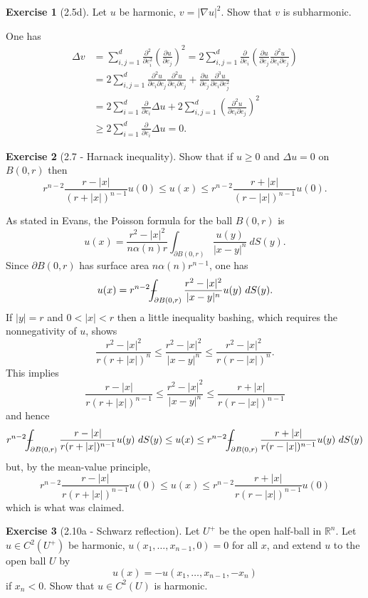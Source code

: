 \documentclass[10pt]{article}
\newcommand{\RR}{\mathbb{R}}
\def\Xint#1{\mathchoice
{\XXint\displaystyle\textstyle{#1}}%
{\XXint\textstyle\scriptstyle{#1}}%
{\XXint\scriptstyle\scriptscriptstyle{#1}}%
{\XXint\scriptscriptstyle\scriptscriptstyle{#1}}%
\!\int}
\def\XXint#1#2#3{{\setbox0=\hbox{$#1{#2#3}{\int}$ }
\vcenter{\hbox{$#2#3$ }}\kern-.6\wd0}}
\def\dashint{\Xint-}
\theoremstyle{definition}
\newtheorem{exer}{Exercise}
\begin{document}
\begin{exer}[2.5d]
Let $u$ be harmonic, $v = |\nabla u|^2$. Show that $v$ is subharmonic.
\end{exer}

One has
\begin{align*}\Delta v &= \sum_{i,j=1}^d \frac{\partial^2}{\partial e_i^2} \left(\frac{\partial u}{\partial e_j} \right)^2 = 2\sum_{i,j=1}^d \frac{\partial}{\partial e_i}\left(\frac{\partial u}{\partial e_j} \frac{\partial^2 u}{\partial e_i \partial e_j}\right)\\
&= 2\sum_{i,j=1}^d \frac{\partial^2 u}{\partial e_i \partial e_j} \frac{\partial^2 u}{\partial e_i \partial e_j} + \frac{\partial u}{\partial e_j} \frac{\partial^3 u}{\partial e_i \partial e_j^2}\\
&= 2\sum_{i=1}^d \frac{\partial}{\partial e_i} \Delta u + 2\sum_{i,j=1}^d \left(\frac{\partial^2 u}{\partial e_i \partial e_j}\right)^2\\
&\geq 2\sum_{i=1}^d \frac{\partial}{\partial e_i} \Delta u = 0.
\end{align*}

\begin{exer}[2.7 - Harnack inequality]
Show that if $u \geq 0$ and $\Delta u = 0$ on $B(0, r)$ then
$$r^{n-2} \frac{r - |x|}{(r + |x|)^{n-1}} u(0) \leq u(x) \leq r^{n-2} \frac{r + |x|}{(r - |x|)^{n-1}} u(0).$$
\end{exer}

As stated in Evans, the Poisson formula for the ball $B(0, r)$ is
$$u(x) = \frac{r^2 - |x|^2}{n\alpha(n)r} \int_{\partial B(0, r)} \frac{u(y)}{|x - y|^n} ~dS(y).$$
Since $\partial B(0, r)$ has surface area $n\alpha(n)r^{n-1}$, one has
$$u(x) = r^{n-2} \dashint_{\partial B(0, r)} \frac{r^2 - |x|^2}{|x - y|^n} u(y)~dS(y).$$
If $|y| = r$ and $0 < |x| < r$ then a little inequality bashing, which requires the nonnegativity of $u$, shows
$$\frac{r^2 - |x|^2}{r(r+|x|)^n} \leq \frac{r^2 - |x|^2}{|x - y|^n} \leq \frac{r^2 - |x|^2}{r(r-|x|)^n}.$$
This implies
$$\frac{r-|x|}{r(r+|x|)^{n-1}} \leq \frac{r^2 - |x|^2}{|x - y|^n} \leq \frac{r+|x|}{r(r-|x|)^{n-1}}$$
and hence
$$r^{n-2} \dashint_{\partial B(0, r)} \frac{r-|x|}{r(r+|x|)^{n-1}} u(y)~dS(y) \leq u(x) \leq r^{n-2} \dashint_{\partial B(0, r)} \frac{r+|x|}{r(r-|x|)^{n-1}} u(y)~dS(y)$$
but, by the mean-value principle,
$$r^{n-2} \frac{r-|x|}{r(r+|x|)^{n-1}} u(0) \leq u(x) \leq r^{n-2} \frac{r+|x|}{r(r-|x|)^{n-1}} u(0)$$
which is what was claimed.

\begin{exer}[2.10a - Schwarz reflection]
Let $U^+$ be the open half-ball in $\RR^n$. Let $u \in C^2(U^+)$ be harmonic, $u(x_1, \dots, x_{n-1}, 0) = 0$ for all $x$, and extend $u$ to the open ball $U$ by
$$u(x) = -u(x_1, \dots, x_{n-1}, -x_n)$$
if $x_n < 0$.
Show that $u \in C^2(U)$ is harmonic.
\end{exer}
\end{document}
